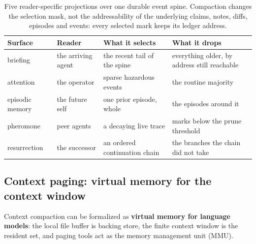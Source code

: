 \documentclass[11pt,a4paper]{article}
\theoremstyle{definition}
\theoremstyle{plain}
\begin{document}
%
\begin{table}[H]
\centering
\caption{Five reader-specific projections over one durable event spine. Compaction changes the selection mask, not the addressability of the underlying claims, notes, diffs, episodes and events: every selected mark keeps its ledger address.}
\label{tab:ls-read-surfaces}
\small
\renewcommand{\arraystretch}{1.15}
\begin{tabularx}{\linewidth}{@{}l l >{\raggedright\arraybackslash}X >{\raggedright\arraybackslash}X@{}}
\toprule
\textbf{Surface} & \textbf{Reader} & \textbf{What it selects} & \textbf{What it drops} \\
\midrule
briefing & the arriving agent & the recent tail of the spine & everything older, by address still reachable \\
attention & the operator & sparse hazardous events & the routine majority \\
episodic memory & the future self & one prior episode, whole & the episodes around it \\
pheromone & peer agents & a decaying live trace & marks below the prune threshold \\
resurrection & the successor & an ordered continuation chain & the branches the chain did not take \\
\bottomrule
\end{tabularx}
\end{table}

\subsection{Context paging: virtual memory for the context window}\label{sec:context-paging}

Context compaction can be formalized as \textbf{virtual memory for language models}: the local file buffer is backing store, the finite context window is the resident set, and paging tools act as the memory management unit (MMU).
\end{document}
